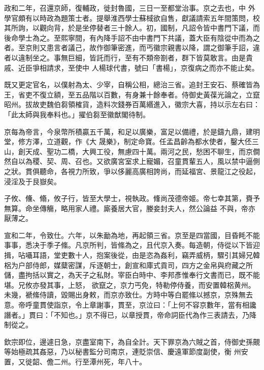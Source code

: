 \begin{pinyinscope}
 政和二年，召還京師，復輔政，徙封魯國，三日一至都堂治事。京之去也，中
 外學官頗有以時政為題策士者。提舉淮西學士蘇棫欲自售，獻議請索五年間策問，校其所詢，以觀向背，於是坐停替者三十餘人。初，國制，凡詔令皆中書門下議，而後命學士為之。至熙寧間，有內降手詔不由中書門下共議，蓋大臣有陰從中而為之者。至京則又患言者議己，故作御筆密進，而丐徽宗親書以降，謂之御筆手詔，違者以違制坐之。事無巨細，皆託而行，至有不類帝劄者，群下皆莫敢言。由是貴戚、近臣爭相請求，至使中
 人楊球代書，號曰「書楊」，京復病之而亦不能止矣。



 既又更定官名，以僕射為太、少宰，自稱公相，總治三省。追封王安石、蔡確皆為王，省吏不復立額，至五品階以百數，有身兼十餘奉者。侍御史黃葆光論之，立竄昭州。拔故吏魏伯芻領榷貨，造料次錢券百萬緡進入，徽宗大喜，持以示左右曰：「此太師與我奉料也。」擢伯芻至徽猷閣待制。



 京每為帝言，今泉幣所積贏五千萬，和足以廣樂，富足以備禮，於是鑄九鼎，建明堂，修方澤，立道觀，作《大
 晟樂》，制定命寶。任孟昌齡為都水使者，鑿大伾三山，創天成、聖功二橋，大興工役，無慮四十萬。兩河之民，愁困不聊生，而京僴然自以為稷、契、周、召也。又欲廣宮室求上寵媚，召童貫輩五人，風以禁中逼側之狀。貫俱聽命，各視力所致，爭以侈麗高廣相誇尚，而延福宮、景龍江之役起，浸淫及于艮嶽矣。



 子攸、儵、翛，攸子行，皆至大學士，視執政。鞗尚茂德帝姬。帝七幸其第，賚予無算。命坐傳觴，略用家人禮。廝養居大官，媵妾封夫人，然公論益
 不與，帝亦厭薄之。



 宣和二年，令致仕。六年，以朱勔為地，再起領三省。京至是四當國，目昏眊不能事事，悉决于季子絛。凡京所判，皆絛為之，且代京入奏。每造朝，侍從以下皆迎揖，呫囁耳語，堂吏數十人，抱案後從，由是恣為姦利，竊弄威柄，驟引其婦兄韓梠为户部侍郎，媒糵密謀，斥逐朝士，創宣和庫式貢司，四方之金帛與府藏之所儲，盡拘括以實之，為天子之私財。宰臣白時中、李邦彥惟奉行文書而已，既不能堪。兄攸亦發其事，上怒，
 欲竄之，京力丐免，特勒停侍養，而安置韓梠黄州。未幾，褫絛侍讀，毀賜出身敕，而京亦致仕。方時中等白罷絛以撼京，京殊無去意。帝呼童貫使詣京，令上章謝事，貫至，京泣曰：「上何不容京數年，當有相讒譖者。」貫曰：「不知也。」京不得已，以章授貫，帝命詞臣代為作三表請去，乃降制從之。



 欽宗即位，邊遽日急，京盡室南下，為自全計。天下罪京為六賊之首，侍御史孫覿等始極疏其姦惡，乃以秘書監分司南京，連貶崇信、慶遠軍節度副使，衡
 州安置，又徙韶、儋二州。行至潭州死，年八十。




\end{pinyinscope}
